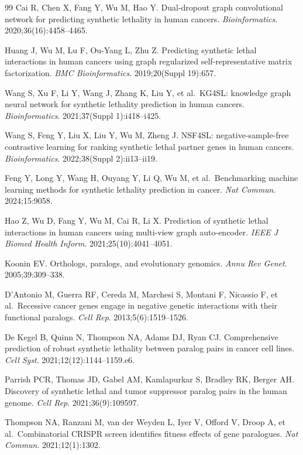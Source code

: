 \documentclass[11pt,a4paper]{article}
\begin{document}
\begin{thebibliography}{99}
 Cai R, Chen X, Fang Y, Wu M, Hao Y. Dual-dropout graph convolutional network for predicting synthetic lethality in human cancers. \textit{Bioinformatics}. 2020;36(16):4458--4465.

 Huang J, Wu M, Lu F, Ou-Yang L, Zhu Z. Predicting synthetic lethal interactions in human cancers using graph regularized self-representative matrix factorization. \textit{BMC Bioinformatics}. 2019;20(Suppl 19):657.

 Wang S, Xu F, Li Y, Wang J, Zhang K, Liu Y, et al.\ KG4SL: knowledge graph neural network for synthetic lethality prediction in human cancers. \textit{Bioinformatics}. 2021;37(Suppl 1):i418--i425.

 Wang S, Feng Y, Liu X, Liu Y, Wu M, Zheng J. NSF4SL: negative-sample-free contrastive learning for ranking synthetic lethal partner genes in human cancers. \textit{Bioinformatics}. 2022;38(Suppl 2):ii13--ii19.

 Feng Y, Long Y, Wang H, Ouyang Y, Li Q, Wu M, et al.\ Benchmarking machine learning methods for synthetic lethality prediction in cancer. \textit{Nat Commun}. 2024;15:9058.

 Hao Z, Wu D, Fang Y, Wu M, Cai R, Li X. Prediction of synthetic lethal interactions in human cancers using multi-view graph auto-encoder. \textit{IEEE J Biomed Health Inform}. 2021;25(10):4041--4051.

 Koonin EV. Orthologs, paralogs, and evolutionary genomics. \textit{Annu Rev Genet}. 2005;39:309--338.

 D'Antonio M, Guerra RF, Cereda M, Marchesi S, Montani F, Nicassio F, et al.\ Recessive cancer genes engage in negative genetic interactions with their functional paralogs. \textit{Cell Rep}. 2013;5(6):1519--1526.

 De Kegel B, Quinn N, Thompson NA, Adams DJ, Ryan CJ. Comprehensive prediction of robust synthetic lethality between paralog pairs in cancer cell lines. \textit{Cell Syst}. 2021;12(12):1144--1159.e6.

 Parrish PCR, Thomas JD, Gabel AM, Kamlapurkar S, Bradley RK, Berger AH. Discovery of synthetic lethal and tumor suppressor paralog pairs in the human genome. \textit{Cell Rep}. 2021;36(9):109597.

 Thompson NA, Ranzani M, van der Weyden L, Iyer V, Offord V, Droop A, et al.\ Combinatorial CRISPR screen identifies fitness effects of gene paralogues. \textit{Nat Commun}. 2021;12(1):1302.


\end{thebibliography}
\end{document}

